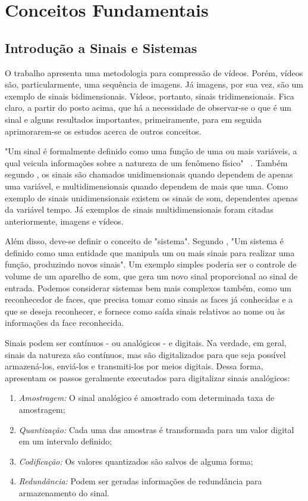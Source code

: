 \documentclass[cic,tc]{iiufrgs}
\begin{document}
\chapter{Conceitos Fundamentais}
\label{cap:ref}

\section{Introdução a Sinais e Sistemas}
O trabalho apresenta uma metodologia para compressão de vídeos.
Porém, vídeos são, particularmente, uma sequência de imagens.
Já imagens, por sua vez, são um exemplo de sinais bidimensionais.
Vídeos, portanto, sinais tridimensionais.
Fica claro, a partir do posto acima, que há a necessidade de observar-se 
o que é um sinal e alguns resultados importantes, primeiramente, para 
em seguida aprimorarem-se os estudos acerca de outros conceitos.

"Um sinal é formalmente definido como uma função de uma ou mais variáveis, 
a qual veicula informações sobre a natureza de um fenômeno físico"~ \cite{haykin2001sinais}.
Também segundo \citet{haykin2001sinais}, os sinais são chamados unidimensionais quando
dependem de apenas uma variável, e multidimensionais quando dependem de mais que uma.
Como exemplo de sinais unidimensionais existem os sinais de som, dependentes apenas da variável tempo.
Já exemplos de sinais multidimensionais foram citadas anteriormente, imagens e vídeos. 

Além disso, deve-se definir o conceito de "sistema". 
Segundo \citet{haykin2001sinais}, "Um sistema é definido como uma entidade que manipula
um ou mais sinais para realizar uma função, produzindo novos sinais".
Um exemplo simples poderia ser o controle de volume de um aparelho de som,
que gera um novo sinal proporcional ao sinal de entrada.
Podemos considerar sistemas bem mais complexos também, como um reconhecedor 
de faces, que precisa tomar como sinais as faces já conhecidas e a que se 
deseja reconhecer, e fornece como saída sinais relativos ao nome ou 
às informações da face reconhecida.

Sinais podem ser contínuos - ou analógicos - e digitais.
Na verdade, em geral, sinais da natureza são contínuos, mas são digitalizados 
para que seja possível armazená-los, enviá-los e transmiti-los por meios digitais.
Dessa forma, \citet{haykin2001sinais} apresentam os passos geralmente executados 
para digitalizar sinais analógicos:
\begin{enumerate}
    \item \emph{Amostragem:} O sinal analógico é amostrado com determinada taxa de amostragem;
    \item \emph{Quantização:} Cada uma das amostras é transformada para um valor digital em um intervalo definido;
    \item \emph{Codificação:} Os valores quantizados são salvos de alguma forma;
    \item \emph{Redundância:} Podem ser geradas informações de redundância para armazenamento do sinal.
\end{enumerate} 
\end{document}
